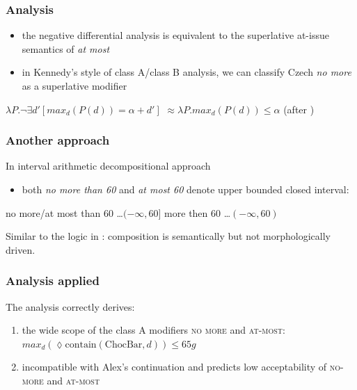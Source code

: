 \documentclass[10pt
]{beamer}
\newcommand{\cond}[1]{\textsc{#1}}
\begin{document}
\begin{frame}
  \frametitle{Analysis}

  \begin{itemize}
    \item the negative differential analysis is equivalent to the superlative at-issue semantics of \textit{at most}
    \item in Kennedy's style of class A/class B analysis, we can classify Czech \textit{no more} as a superlative modifier
  \end{itemize}

  \pex \a $\lambda P.\neg \exists d'[max_d(P(d)) = \alpha + d']$
  \a $\approx \lambda P.max_d(P(d)) \leq \alpha$ \hfill (after \cite{kennedy2015fregean})
  \xe

\end{frame}

\begin{frame}
  \frametitle{Another approach}

  In \cite{zhang2021semantics} interval arithmetic decompositional approach

  \begin{itemize}
    \item both \textit{no more than 60} and \textit{at most 60} denote upper bounded closed interval:
  \end{itemize}
  
  \pex \a no more/at most than 60 \ldots $(-\infty, 60]$
  \a more then 60 \ldots $(-\infty, 60)$
  \xe

  Similar to the logic in \cite{kennedy2015fregean}: composition is semantically but not morphologically driven.


\end{frame}

\begin{frame}
  \frametitle{Analysis applied}


  The analysis correctly derives:
  
  \begin{enumerate}
    \item the wide scope of the class A modifiers \cond{no more} and \cond{at-most}:\\
     $max_d(\lozenge \mathrm{contain}(\mathrm{ChocBar},d)) \leq 65g$
    \item incompatible with Alex's continuation and predicts low acceptability of \cond{no-more} and \cond{at-most}
  \end{enumerate}

\end{frame}
\end{document}
